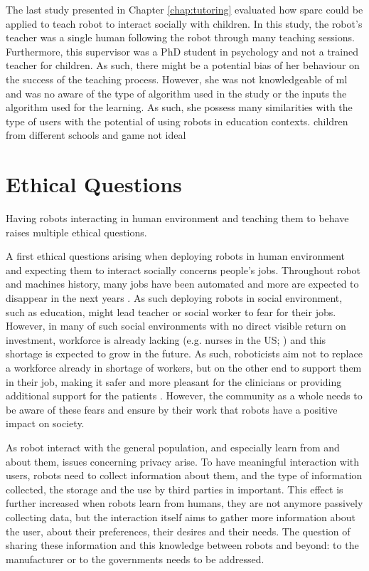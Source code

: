 The last study presented in Chapter \ref{chap:tutoring} evaluated how \gls{sparc} could be applied to teach robot to interact socially with children. In this study, the robot's teacher was a single human following the robot through many teaching sessions. Furthermore, this supervisor was a PhD student in psychology and not a trained teacher for children. As such, there might be a potential bias of her behaviour on the success of the teaching process. However, she was not knowledgeable of \gls{ml} and was no aware of the type of algorithm used in the study or the inputs the algorithm used for the learning. As such, she possess many similarities with the type of users with the potential of using robots in education contexts. 
children from different schools and game not ideal

\section{Ethical Questions} \label{sec:disc_ethics}

Having robots interacting in human environment and teaching them to behave raises multiple ethical questions.

A first ethical questions arising when deploying robots in human environment and expecting them to interact socially concerns people's jobs. Throughout robot and machines history, many jobs have been automated and more are expected to disappear in the next years \citep{frey2017future}. As such deploying robots in social environment, such as education, might lead teacher or social worker to fear for their jobs. However, in many of such social environments with no direct visible return on investment, workforce is already lacking (e.g. nurses in the US; \citealt{nevidjon2001nursing}) and this shortage is expected to grow in the future. As such, roboticists aim not to replace a workforce already in shortage of workers, but on the other end to support them in their job, making it safer and more pleasant for the clinicians or providing additional support for the patients \citep{belpaeme2012multimodal}. However, the community as a whole needs to be aware of these fears and ensure by their work that robots have a positive impact on society.

As robot interact with the general population, and especially learn from and about them, issues concerning privacy arise. To have meaningful interaction with users, robots need to collect information about them, and the type of information collected, the storage and the use by third parties in important. This effect is further increased when robots learn from humans, they are not anymore passively collecting data, but the interaction itself aims to gather more information about the user, about their preferences, their desires and their needs. The question of sharing these information and this knowledge between robots and beyond: to the manufacturer or to the governments needs to be addressed.

